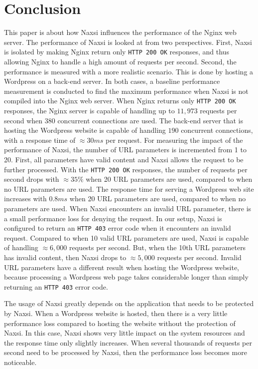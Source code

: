 \documentclass[Conclusion]{subfiles}
\begin{document}
\section{Conclusion}
\label{sec:Conclusion}
This paper is about how Naxsi influences the performance of the \mbox{Nginx} web server. The performance of Naxsi is looked at from two perspectives. First, Naxsi is isolated by making Nginx return only \verb+HTTP 200 OK+ responses, and thus allowing Nginx to handle a high amount of requests per second. Second, the performance is measured with a more realistic scenario. This is done by hosting a Wordpress on a back-end server. In both cases, a baseline performance measurement is conducted to find the maximum performance when Naxsi is not compiled into the Nginx web server. When Nginx returns only \verb+HTTP 200 OK+ responses, the Nginx server is capable of handling up to $11,973$ requests per second when $380$ concurrent connections are used. The back-end server that is hosting the Wordpress website is capable of handling $190$ concurrent connections, with a response time of $\approx 30 ms$ per request. For measuring the impact of the performance of Naxsi, the number of URL parameters is incremented from 1 to 20. First, all parameters have valid content and Naxsi allows the request to be further processed. With the \verb+HTTP 200 OK+ responses, the number of requests per second drops with $\approx 35\%$ when 20 URL parameters are used, compared to when no URL parameters are used. The response time for serving a Wordpress web site increases with $0.8 ms$ when 20 URL parameters are used, compared to when no parameters are used. When Naxsi encounters an invalid URL parameter, there is a small performance loss for denying the request. In our setup, Naxsi is configured to return an \verb+HTTP 403+ error code when it encounters an invalid request. Compared to when 10 valid URL parameters are used, Naxsi is capable of handling $\approx 6,000$ requests per second. But, when the 10th URL parameters has invalid content, then Naxsi drops to $\approx 5,000$ requests per second. Invalid URL parameters have a different result when hosting the Wordpress website, because processing a Wordpress web page takes considerable longer than simply returning an \verb+HTTP 403+ error code.

The usage of Naxsi greatly depends on the application that needs to be protected by Naxsi. When a Wordpress website is hosted, then there is a very little performance loss compared to hosting the website without the protection of Naxsi. In this case, Naxsi shows very little impact on the system resources and the response time only slightly increases. When several thousands of requests per second need to be processed by Naxsi, then the performance loss becomes more noticeable. 
\end{document}
